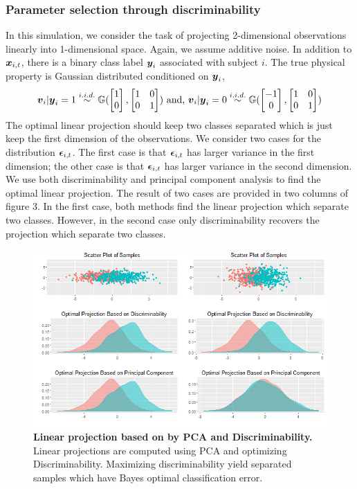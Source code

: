 \documentclass{article}
\begin{document}
\subsubsection{Parameter selection through discriminability  }
In this simulation, we consider the task of projecting 2-dimensional observations linearly into 1-dimensional space. Again, we assume additive noise. In addition to $\boldsymbol{x}_{i,t}$, there is a binary class label $\boldsymbol{y}_{i}$ associated with subject $i$. The true physical property is Gaussian distributed conditioned on $\boldsymbol{y}_i$,
\[\boldsymbol{v}_i|\boldsymbol{y}_i=1 \overset{i.i.d.}{\sim} \mathbb{G}(\begin{bmatrix}1\\0\end{bmatrix},\begin{bmatrix}1& 0\\0& 1\end{bmatrix}) \text{ and, } \boldsymbol{v}_i|\boldsymbol{y}_i=0 \overset{i.i.d.}{\sim} \mathbb{G}(\begin{bmatrix}-1\\0\end{bmatrix},\begin{bmatrix}1& 0\\0& 1\end{bmatrix}) \]
The optimal linear projection should keep two classes separated which is just keep the first dimension of the observations. We consider two cases for the distribution $\boldsymbol{\epsilon}_{i,t}$. The first case is that $\boldsymbol{\epsilon}_{i,t}$ has larger variance in the first dimension; the other case is that $\boldsymbol{\epsilon}_{i,t}$ has larger variance in the second dimension. We use both discriminability and principal component analysis to find the optimal linear projection. The result of two cases are provided in two columns of figure 3. In the first case, both methods find the linear projection which separate two classes. However, in the second case only discriminability recovers the projection which separate two classes. 

\begin{figure}[ht!]
	\includegraphics[width=\linewidth]{../Figs/opt_proj.png}
	\caption{{\bf Linear projection based on by PCA and Discriminability.} Linear projections are computed using PCA and optimizing Discriminability. Maximizing discriminability yield separated samples which have Bayes optimal classification error. }
	\label{fig:3}
\end{figure}
\end{document}
